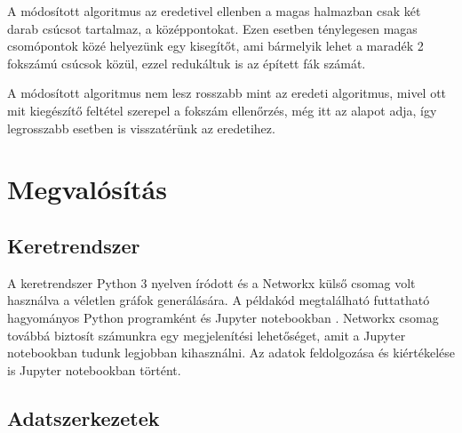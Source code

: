 \documentclass[12pt]{report}
\begin{document}
A módosított algoritmus az eredetivel ellenben a magas halmazban csak két darab csúcsot tartalmaz, a középpontokat.
Ezen esetben ténylegesen magas csomópontok közé helyezünk egy kisegítőt, ami bármelyik lehet a maradék 2 fokszámú csúcsok közül, ezzel redukáltuk is az épített fák számát.

A módosított algoritmus nem lesz rosszabb mint az eredeti algoritmus, mivel ott mit kiegészítő feltétel szerepel a fokszám ellenőrzés, még itt az alapot adja, így legrosszabb esetben is visszatérünk az eredetihez. 

\chapter{Megvalósítás}


\section{Keretrendszer}

A keretrendszer Python 3 \cite{noauthor_python_nodate} nyelven íródott és a Networkx \cite{noauthor_networkx_nodate} külső csomag volt használva a véletlen gráfok generálására.
A példakód megtalálható futtatható hagyományos Python programként és Jupyter notebookban \cite{noauthor_jupyter_nodate}.  
Networkx csomag továbbá biztosít számunkra egy megjelenítési lehetőséget, amit a Jupyter notebookban tudunk legjobban kihasználni.
Az adatok feldolgozása és kiértékelése is Jupyter notebookban történt. 

\section{Adatszerkezetek}
\end{document}
